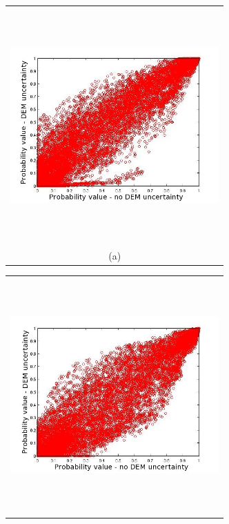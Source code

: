 \documentclass[12pt]{article}
\newcommand{\Pic}[2][0.85]{\begin{center}\texttt{[image: \#2]}
 \end{center} }
\begin{document}
\begin{figure}[H]
      \begin{minipage}[b]{0.6\textwidth}
        \begin{tabular}{c}
       \includegraphics[width=8cm,height=9cm,keepaspectratio]{figs/Galeras_Aster_vs_meth0.jpg}\\
        (a)
        \end{tabular}
    \end{minipage}
    \begin{minipage}{0.6\textwidth}
        \begin{tabular}{c}
	\includegraphics[width=8cm,height=9cm,keepaspectratio]{figs/Galeras_Aster_vs_meth3.jpg}\\

\end{tabular}
\end{minipage}
\end{figure}
\end{document}
